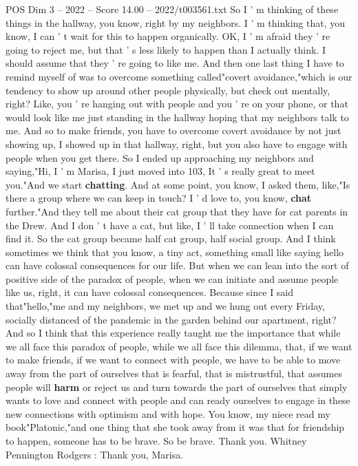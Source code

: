 \begin{textsample}{POS Dim 3 – 2022 – Score 14.00 – 2022/t003561.txt}
So I ' m thinking of these things in the hallway, you know, right by my neighbors.
I ' m thinking that, you know, I can ' t wait for this to happen organically.
OK, I ' m afraid they ' re going to reject me, but that ' s less likely to happen than I actually think.
I should assume that they ' re going to like me.
And then one last thing I have to remind myself of was to overcome something called"covert avoidance,"which is our tendency to show up around other people physically, but check out mentally, right?
Like, you ' re hanging out with people and you ' re on your phone, or that would look like me just standing in the hallway hoping that my neighbors talk to me.
And so to make friends, you have to overcome covert avoidance by not just showing up, I showed up in that hallway, right, but you also have to engage with people when you get there.
So I ended up approaching my neighbors and saying,"Hi, I ' m Marisa, I just moved into 103, It ' s really great to meet you."And we start \textbf{chatting}.
And at some point, you know, I asked them, like,"Is there a group where we can keep in touch?
I ' d love to, you know, \textbf{chat} further."And they tell me about their cat group that they have for cat parents in the Drew.
And I don ' t have a cat, but like, I ' ll take connection when I can find it.
So the cat group became half cat group, half social group.
And I think sometimes we think that you know, a tiny act, something small like saying hello can have colossal consequences for our life.
But when we can lean into the sort of positive side of the paradox of people, when we can initiate and assume people like us, right, it can have colossal consequences.
Because since I said that"hello,"me and my neighbors, we met up and we hung out every Friday, socially distanced of the pandemic in the garden behind our apartment, right?
And so I think that this experience really taught me the importance that while we all face this paradox of people, while we all face this dilemma, that, if we want to make friends, if we want to connect with people, we have to be able to move away from the part of ourselves that is fearful, that is mistrustful, that assumes people will \textbf{harm} or reject us and turn towards the part of ourselves that simply wants to love and connect with people and can ready ourselves to engage in these new connections with optimism and with hope.
You know, my niece read my book"Platonic,"and one thing that she took away from it was that for friendship to happen, someone has to be brave.
So be brave.
Thank you.
Whitney Pennington Rodgers : Thank you, Marisa.

\end{textsample}
